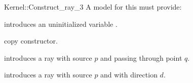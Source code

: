 \begin{ccRefFunctionObjectConcept}{Kernel::Construct_ray_3}
A model for this must provide:



\ccHidden {}
             {introduces an uninitialized variable .}

\ccHidden {}
 	    {copy constructor.}

            {introduces a ray  
             with source $p$ and passing through point $q$.}

            {introduces a ray  with source $p$ and with 
             direction $d$.}

\end{ccRefFunctionObjectConcept}
